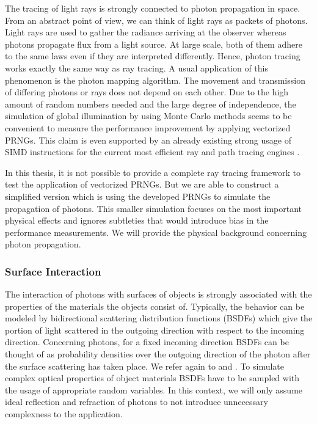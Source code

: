 \documentclass{stdlocal}
\begin{document}
    The tracing of light rays is strongly connected to photon propagation in space.
    From an abstract point of view, we can think of light rays as packets of photons.
    Light rays are used to gather the radiance arriving at the observer whereas photons propagate flux from a light source.
    At large scale, both of them adhere to the same laws even if they are interpreted differently.
    Hence, photon tracing works exactly the same way as ray tracing.
    A usual application of this phenomenon is the photon mapping algorithm.
    The movement and transmission of differing photons or rays does not depend on each other.
    Due to the high amount of random numbers needed and the large degree of independence, the simulation of global illumination by using Monte Carlo methods seems to be convenient to measure the performance improvement by applying vectorized PRNGs.
    This claim is even supported by an already existing strong usage of SIMD instructions for the current most efficient ray and path tracing engines \autocite{embree}.

    In this thesis, it is not possible to provide a complete ray tracing framework to test the application of vectorized PRNGs.
    But we are able to construct a simplified version which is using the developed PRNGs to simulate the propagation of photons.
    This smaller simulation focuses on the most important physical effects and ignores subtleties that would introduce bias in the performance measurements.
    We will provide the physical background concerning photon propagation.



    \subsubsection*{Surface Interaction} %
    \label{ssub:surface_interaction}
      The interaction of photons with surfaces of objects is strongly associated with the properties of the materials the objects consist of.
      Typically, the behavior can be modeled by bidirectional scattering distribution functions (BSDFs) which give the portion of light scattered in the outgoing direction with respect to the incoming direction.
      Concerning photons, for a fixed incoming direction BSDFs can be thought of as probability densities over the outgoing direction of the photon after the surface scattering has taken place.
      We refer again to \textcite{pharr2016} and \textcite{pawellek2017}.
      To simulate complex optical properties of object materials BSDFs have to be sampled with the usage of appropriate random variables.
      In this context, we will only assume ideal reflection and refraction of photons to not introduce unnecessary complexness to the application.
\end{document}
